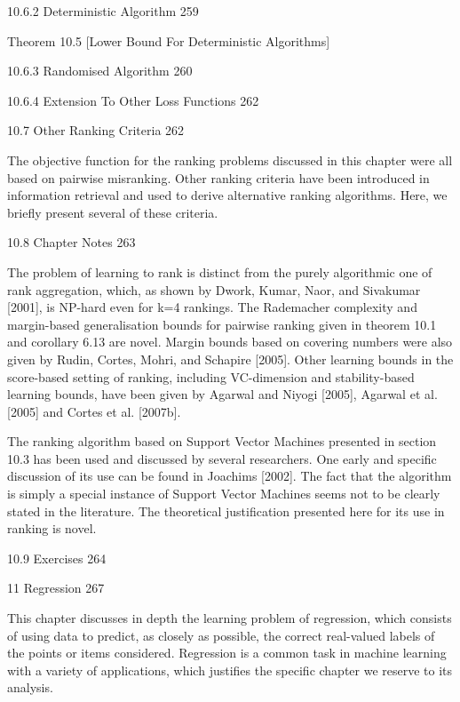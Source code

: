 10.6.2 Deterministic Algorithm 259

Theorem 10.5 [Lower Bound For Deterministic Algorithms]

10.6.3 Randomised Algorithm 260



10.6.4 Extension To Other Loss Functions 262



10.7 Other Ranking Criteria 262

The objective function for the ranking problems discussed in this chapter were all based on pairwise misranking. Other ranking criteria have been introduced in information retrieval and used to derive alternative ranking algorithms. Here, we briefly present several of these criteria.

10.8 Chapter Notes 263

The problem of learning to rank is distinct from the purely algorithmic one of rank aggregation, which, as shown by Dwork, Kumar, Naor, and Sivakumar [2001], is NP-hard even for k=4 rankings. The Rademacher complexity and margin-based generalisation bounds for pairwise ranking given in theorem 10.1 and corollary 6.13 are novel. Margin bounds based on covering numbers were also given by Rudin, Cortes, Mohri, and Schapire [2005]. Other learning bounds in the score-based setting of ranking, including VC-dimension and stability-based learning bounds, have been given by Agarwal and Niyogi [2005], Agarwal et al. [2005] and Cortes et al. [2007b].

The ranking algorithm based on Support Vector Machines presented in section 10.3 has been used and discussed by several researchers. One early and specific discussion of its use can be found in Joachims [2002]. The fact that the algorithm is simply a special instance of Support Vector Machines seems not to be clearly stated in the literature. The theoretical justification presented here for its use in ranking is novel.

10.9 Exercises 264



11 Regression 267

This chapter discusses in depth the learning problem of regression, which consists of using data to predict, as closely as possible, the correct real-valued labels of the points or items considered. Regression is a common task in machine learning with a variety of applications, which justifies the specific chapter we reserve to its analysis.

